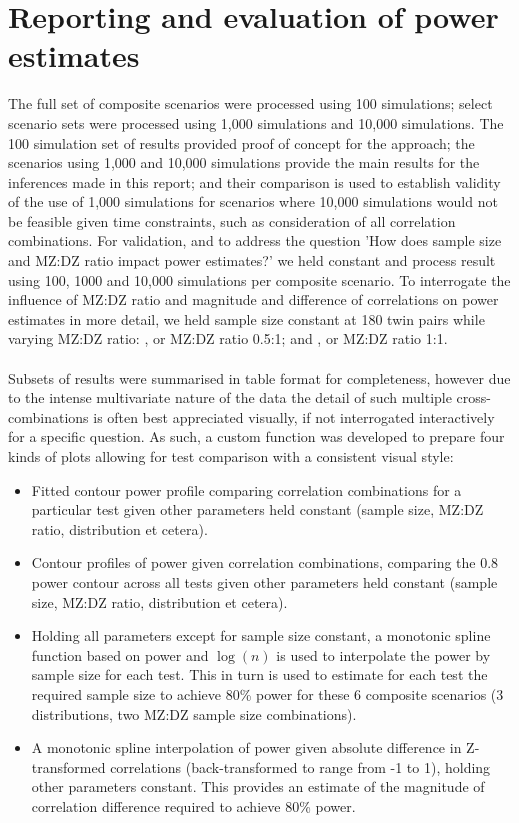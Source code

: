 \section{Reporting and evaluation of power estimates}
The full set of composite scenarios were processed using 100 simulations; select scenario sets were processed using 1,000 simulations and 10,000 simulations.  The 100 simulation set of results provided proof of concept for the approach; the scenarios using 1,000 and 10,000 simulations provide the main results for the inferences made in this report; and their comparison is used to establish validity of the use of 1,000 simulations for scenarios where 10,000 simulations would not be feasible given time constraints, such as consideration of all correlation combinations.  For validation, and to address the question 'How does sample size and MZ:DZ ratio impact power estimates?' we held constant  and process result using 100, 1000 and 10,000 simulations per composite scenario.  To interrogate the influence of MZ:DZ ratio and magnitude and difference of correlations on power estimates in more detail, we held sample size constant at 180 twin pairs while varying MZ:DZ ratio:  , or MZ:DZ ratio 0.5:1; and  , or MZ:DZ ratio 1:1.
\\
\\
Subsets of results were summarised in table format for completeness, however due to the intense multivariate nature of the data the detail of such multiple cross-combinations is often best appreciated visually, if not interrogated interactively for a specific question.  As such, a custom function was developed to prepare four kinds of plots allowing for test comparison with a consistent visual style: 
\begin{itemize}
\item Fitted contour power profile comparing correlation combinations for a particular test given other parameters held constant (sample size, MZ:DZ ratio, distribution et cetera).
\item Contour profiles of power given correlation combinations, comparing the 0.8 power contour across all tests given other parameters held constant (sample size, MZ:DZ ratio, distribution et cetera).
\item Holding all parameters except for sample size constant, a monotonic spline function based on power and $\log(n)$ is used to interpolate the power by sample size for each test. This in turn is used to estimate for each test the required sample size to achieve 80\% power for these 6 composite scenarios (3 distributions, two MZ:DZ sample size combinations).
\item A monotonic spline interpolation of power given absolute difference in  Z-transformed correlations (back-transformed to range from -1 to 1), holding other parameters constant.  This provides an estimate of the magnitude of correlation difference required to achieve 80\% power.
\end{itemize}
